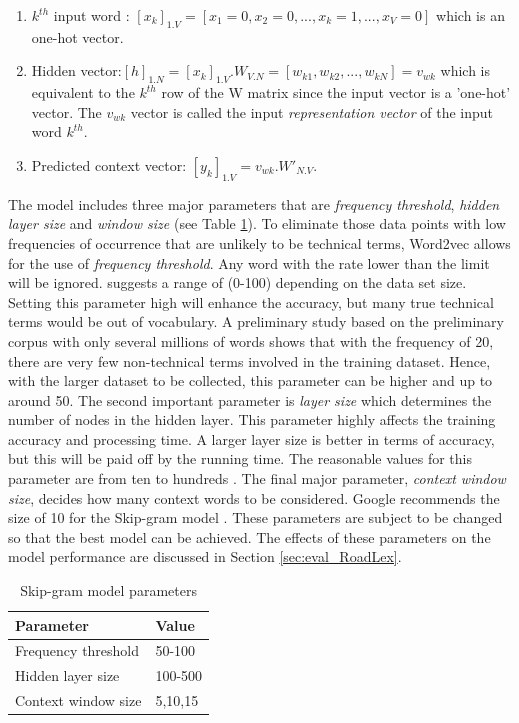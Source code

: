 \documentclass[Journal,InsideFigs, DoubleSpace]{ascelike} %
\begin{document}
%
\begin{enumerate}
	\item $k^{th}$ input word : $[x_k]_{1.V} = [x_1=0, x_2=0,...,x_k=1,..., x_V=0]$ which is an one-hot vector.
	\item Hidden vector:$[h]_{1.N} = [x_k]_{1.V}.W_{V.N} = [w_{k1},w_{k2},..., w_{kN}]= v_{wk}$ which is equivalent to the $k^{th}$ row of the W matrix since the input vector is a 'one-hot' vector. The $v_{wk}$ vector is called the input \textit{representation vector} of the input word $k^{th}$.
	\item Predicted context vector: $[y_k]_{1.V} = v_{wk}.W'_{N.V}$. 
\end{enumerate}
%
\par
The model includes three major parameters that are \textit{frequency threshold}, \textit{hidden layer size} and \textit{window size} (see Table \ref{table:nn-parameters}). To eliminate those data points with low frequencies of occurrence that are unlikely to be technical terms, Word2vec allows for the use of \textit{frequency threshold}. Any word with the rate lower than the limit will be ignored.  suggests a range of (0-100) depending on the data set size. Setting this parameter high will enhance the accuracy, but many true technical terms would be out of vocabulary. A preliminary study based on the preliminary corpus with only several millions of words shows that with the frequency of 20, there are very few non-technical terms involved in the training dataset. Hence, with the larger dataset to be collected, this parameter can be higher and up to around 50. The second important parameter is \textit{layer size} which determines the number of nodes in the hidden layer. This parameter highly affects the training accuracy and processing time. A larger layer size is better in terms of accuracy, but this will be paid off by the running time. The reasonable values for this parameter are from ten to hundreds \cite{rehurek14}. The final major parameter, \textit{context window size}, decides how many context words to be considered. Google recommends the size of 10 for the Skip-gram model \cite{google2016}. These parameters are subject to be changed so that the best model can be achieved. The effects of these parameters on the model performance are discussed in Section \ref{sec:eval_RoadLex}.
%
\begin{table} [t]
	\caption{Skip-gram model parameters}
	\label{table:nn-parameters}
	\centering
	\small
	\renewcommand{\arraystretch}{1.25}
	\begin{tabular}{l l}
		\hline
		\textbf{Parameter} & \textbf{Value}\\
		\hline
		Frequency threshold & 50-100\\
		Hidden layer size		&	100-500\\
		Context window size	&	5,10,15\\
		\hline
	\end{tabular}
	\normalsize
\end{table}
\end{document}
